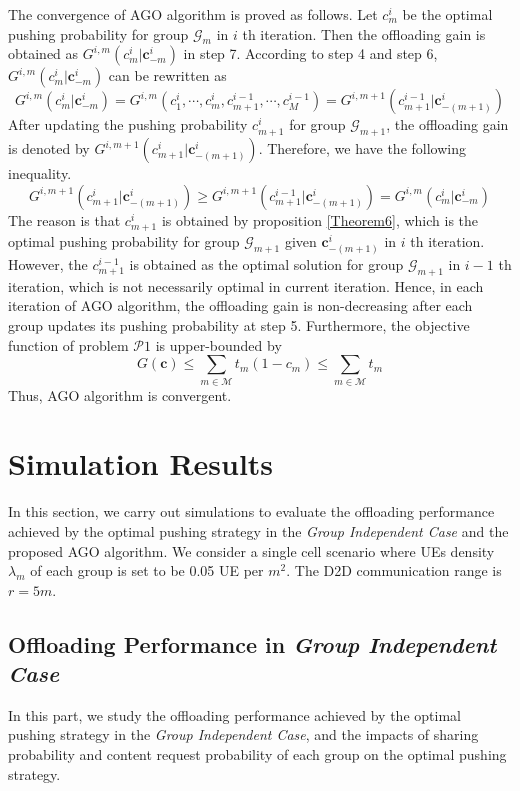 \documentclass[12pt, draftclsnofoot, onecolumn]{IEEEtran}
\begin{document}
The convergence of AGO algorithm is proved as follows.
Let $c^i_m$ be the optimal pushing probability for group $\mathcal{G}_m$ in $i$ th iteration.
Then the offloading gain is obtained as $G^{i,m}(c^i_m|\bm{c}_{-m}^i)$ in step 7.
According to step 4 and step 6, $G^{i,m}(c^i_m|\bm{c}_{-m}^i)$ can be rewritten as
\begin{equation}
G^{i,m}(c^i_m|\bm{c}_{-m}^i)=G^{i,m}(c_1^{i},\cdots,c_m^i,c_{m+1}^{i-1},\cdots,c_{M}^{i-1})=G^{i,m+1}(c_{m+1}^{i-1}|\bm{c}_{-(m+1)}^i)
\end{equation}
After updating the pushing probability $c^i_{m+1}$ for group $\mathcal{G}_{m+1}$, the offloading gain is denoted by $G^{i,m+1}(c^i_{m+1}|\bm{c}_{-(m+1)}^i)$.
Therefore, we have the following inequality.
\begin{equation} \label{Astep}
G^{i,m+1}(c^i_{m+1}|\bm{c}_{-(m+1)}^i) \geq G^{i,m+1}(c_{m+1}^{i-1}|\bm{c}_{-(m+1)}^i)=G^{i,m}(c^i_m|\bm{c}_{-m}^i)
\end{equation}
The reason is that $c^i_{m+1}$ is obtained by proposition \ref{Theorem6}, which is the optimal pushing probability for group $\mathcal{G}_{m+1}$ given $\bm{c}_{-(m+1)}^i$ in $i$ th iteration.
However, the $c^{i-1}_{m+1}$ is obtained as the optimal solution for group $\mathcal{G}_{m+1}$ in $i-1$ th iteration, which is not necessarily optimal in current iteration.
Hence, in each iteration of AGO algorithm, the offloading gain is non-decreasing after each group updates its pushing probability at step 5.
Furthermore, the objective function of problem $\mathcal{P}1$ is upper-bounded by
\begin{equation}
G(\bm{c}) \leq \sum \limits_{m \in \mathcal{M}} t_m (1-c_m)  \leq  \sum \limits_{m \in \mathcal{M}} t_m
\end{equation}
Thus,  AGO algorithm is convergent.



\section{Simulation Results}

In this section, we carry out simulations to evaluate the offloading performance achieved by the optimal pushing strategy in the \textit{Group Independent Case} and the proposed AGO algorithm. We consider a single cell scenario where UEs density $\lambda_m$ of each group is set to be 0.05 UE per $m^2$. The D2D communication range is $r = 5m$.

\subsection{Offloading Performance in \textit{Group Independent Case}}
In this part, we study the offloading performance achieved by the optimal pushing strategy in the \textit{Group Independent Case}, and the impacts of sharing probability and content request probability of each group on the optimal pushing strategy.
\end{document}
